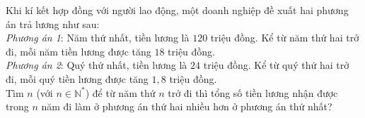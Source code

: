 \begin{bt}%

	Khi kí kết hợp đồng với người lao động, một doanh nghiệp đề xuất hai phương án trả lương như sau:\\
	\textit{Phương án 1}: Năm thứ nhất, tiền lương là $120$ triệu đồng. Kể từ năm thứ hai trở đi, mỗi năm tiền lương được tăng $18$ triệu đồng.\\
	\textit{Phương án 2}: Quý thứ nhất, tiền lương là $24$ triệu đồng. Kể từ quý thứ hai trở đi, mỗi quý tiền lương được tăng $1{,}8$ triệu đồng.\\
	Tìm $n$ (với $n \in \mathbb{N^*}$) để từ năm thứ $n$ trở đi thì tổng số tiền lương nhận được trong $n$ năm đi làm ở phương án thứ hai nhiều hơn ở phương án thứ nhất?
\end{bt}

